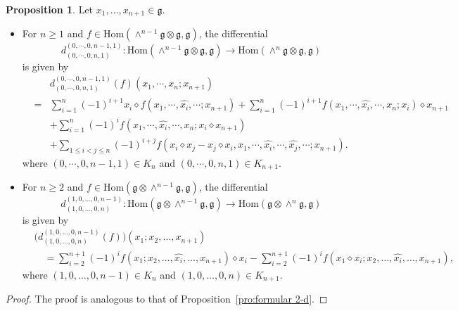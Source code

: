 \documentclass[12pt]{amsart}
\theoremstyle{definition}
\newtheorem{pro}[thm]{Proposition}
\newcommand{\g}{\mathfrak g}
\newcommand{\Hom}{\mathrm{Hom}}
\newcommand{\ot}{\otimes}
\begin{document}
\begin{pro}\label{pro-pL-rcom}
Let $x_1,\dots,x_{n+1}\in\g$.
\begin{itemize}
\item[{\rm (i)}] For $n\geq 1$ and $f\in \Hom(\wedge^{n-1}\g\ot \g,\g)$, the differential
\[
	d_{(0,\cdots,0,n,1)}^{(0,\cdots,0,n-1,1)}:\Hom(\wedge^{n-1}\g\ot \g,\g)\to \Hom(\wedge^{n}\g\ot \g,\g)
\]
is given by
\begin{eqnarray*}
	&&d_{(0,\cdots,0,n,1)}^{(0,\cdots,0,n-1,1)}(f)(x_1,\cdots,x_n;x_{n+1})\\
	&=&\sum\limits_{i=1}^n (-1)^{i+1}x_i \diamond f(x_1,\cdots,\hat{x_i},\cdots;x_{n+1})+\sum\limits_{i=1}^n(-1)^{i+1}f(x_1,\cdots,\hat{x_i},\cdots,x_n;x_i)\diamond x_{n+1}\\
	&&+\sum\limits_{i=1}^n(-1)^{i} f(x_1,\cdots,\hat{x_i},\cdots,x_n;x_i\diamond x_{n+1})\\
	&&+\sum\limits_{1\leq i<j\leq n}(-1)^{i+j} f(x_i\diamond x_j-x_j\diamond x_i,x_1,\cdots,\hat{x_i},\cdots,\hat{x_j},\cdots;x_{n+1}).
\end{eqnarray*}
where  $(0,\cdots,0,n-1,1)\in K_n$ and $(0,\cdots,0,n,1)\in K_{n+1}$.
\item[{\rm (ii)}] 	For $n\geq 2$ and $f\in\Hom(\g\otimes\wedge^{n-1}\g,\g)$,  the differential
\[
d^{(1,0,\dots,0,n-1)}_{(1,0,\dots,0,n)} \colon \Hom(\g\otimes\wedge^{n-1}\g,\g) \to \Hom(\g\otimes\wedge^{n}\g,\g)
\]
is given by
\begin{align*}
	&\bigl(d^{(1,0,\dots,0,n-1)}_{(1,0,\dots,0,n)}(f)\bigr)(x_1;x_2,\dots,x_{n+1}) \\
	&\quad = \sum_{i=2}^{n+1}(-1)^i f(x_1;x_2,\dots,\hat{x_i},\dots,x_{n+1})\diamond x_i
	- \sum_{i=2}^{n+1}(-1)^i f(x_1\diamond x_i;x_2,\dots,\hat{x_i},\dots,x_{n+1}),
\end{align*}
where  $(1,0,\dots,0,n-1)\in K_n$ and $(1,0,\dots,0,n)\in K_{n+1}$. 		
\end{itemize}
\end{pro}
\begin{proof}
	The proof is analogous to that of Proposition~\ref{pro:formular 2-d}.
\end{proof}
\end{document}
